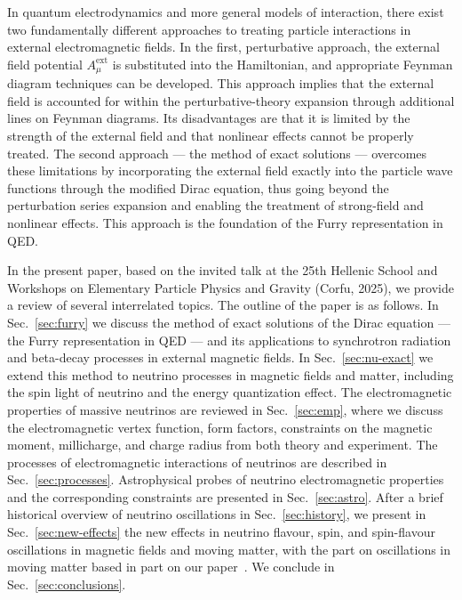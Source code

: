 \documentclass[a4paper,11pt]{article}
\begin{document}
In quantum electrodynamics and more general models of interaction, there exist two fundamentally different approaches to treating particle interactions in external electromagnetic fields. In the first, perturbative approach, the external field potential $A_\mu^{\text{ext}}$ is substituted into the Hamiltonian, and appropriate Feynman diagram techniques can be developed. This approach implies that the external field is accounted for within the perturbative-theory expansion through additional lines on Feynman diagrams. Its disadvantages are that it is limited by the strength of the external field and that nonlinear effects cannot be properly treated. The second approach --- the method of exact solutions --- overcomes these limitations by incorporating the external field exactly into the particle wave functions through the modified Dirac equation, thus going beyond the perturbation series expansion and enabling the treatment of strong-field and nonlinear effects. This approach is the foundation of the Furry representation in QED.

In the present paper, based on the invited talk at the 25th Hellenic School and Workshops on Elementary Particle Physics and Gravity (Corfu, 2025), we provide a review of several interrelated topics. The outline of the paper is as follows. In Sec.~\ref{sec:furry} we discuss the method of exact solutions of the Dirac equation --- the Furry representation in QED --- and its applications to synchrotron radiation and beta-decay processes in external magnetic fields. In Sec.~\ref{sec:nu-exact} we extend this method to neutrino processes in magnetic fields and matter, including the spin light of neutrino and the energy quantization effect. The electromagnetic properties of massive neutrinos are reviewed in Sec.~\ref{sec:emp}, where we discuss the electromagnetic vertex function, form factors, constraints on the magnetic moment, millicharge, and charge radius from both theory and experiment. The processes of electromagnetic interactions of neutrinos are described in Sec.~\ref{sec:processes}. Astrophysical probes of neutrino electromagnetic properties and the corresponding constraints are presented in Sec.~\ref{sec:astro}. After a brief historical overview of neutrino oscillations in Sec.~\ref{sec:history}, we present in Sec.~\ref{sec:new-effects} the new effects in neutrino flavour, spin, and spin-flavour oscillations in magnetic fields and moving matter, with the part on oscillations in moving matter based in part on our paper~\cite{Studenikin:2019arXiv}. We conclude in Sec.~\ref{sec:conclusions}.
\end{document}
